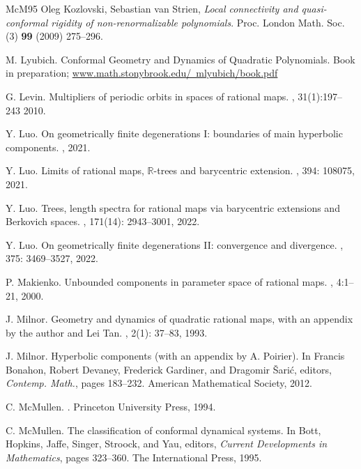 \documentclass[11pt, reqno]{amsart}
\numberwithin{equation}{section}
\theoremstyle{plain}
\theoremstyle{theorem}
\theoremstyle{plain}
\theoremstyle{definition}
\newcommand{\R}{\mathbb{R}}
\numberwithin{figure}{section}
\begin{document}
\begin{thebibliography}{McM95}
 Oleg Kozlovski, Sebastian van Strien, \emph{Local connectivity and quasi-conformal rigidity of non-renormalizable polynomials}. {Proc. London Math. Soc.} (3) \textbf{99} (2009) 275--296. 


 M. Lyubich. Conformal Geometry and Dynamics of Quadratic Polynomials. Book in preparation; \href{www.math.stonybrook.edu/~mlyubich/book.pdf}{www.math.stonybrook.edu/~mlyubich/book.pdf}

G. Levin.
\newblock Multipliers of periodic orbits in spaces of rational maps.
, 31(1):197--243 2010.



Y. Luo.
\newblock On geometrically finite degenerations {I}: boundaries of main
  hyperbolic components.
, 2021.

Y. Luo.
\newblock Limits of rational maps, $\R$-trees and barycentric extension.
, 394: 108075, 2021.

Y. Luo.
\newblock Trees, length spectra for rational maps via barycentric extensions and Berkovich spaces.
, 171(14): 2943--3001, 2022.

Y. Luo.
\newblock On geometrically finite degenerations {II}: convergence and divergence.
, 375: 3469--3527, 2022.



P. Makienko.
\newblock Unbounded components in parameter space of rational maps.
, 4:1--21, 2000.

J. Milnor.
\newblock Geometry and dynamics of quadratic rational maps, with an appendix by the author and Lei Tan.
, 2(1): 37--83, 1993.


J. Milnor.
\newblock Hyperbolic components (with an appendix by A. Poirier).
\newblock In Francis Bonahon, Robert Devaney, Frederick Gardiner, and Dragomir
  \v{S}ari\'c, editors, {\em Contemp. Math.}, pages 183--232. American
  Mathematical Society, 2012.
  
C. McMullen.
.
\newblock Princeton University Press, 1994.

C. McMullen.
\newblock The classification of conformal dynamical systems.
\newblock In Bott, Hopkins, Jaffe, Singer, Stroock, and Yau, editors, {\em
  Current Developments in Mathematics}, pages 323--360. The International Press,
  1995.


\end{thebibliography}
\end{document}
